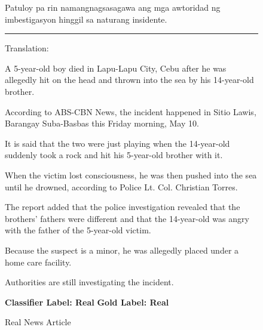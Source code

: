 \begin{figure}[h!]
{{                        \small \raggedright Patuloy pa rin namangnagsasagawa ang mga awtoridad ng imbestigasyon hinggil sa naturang insidente.\linebreak

                        \noindent\rule{0.5\textwidth}{0.4pt}\linebreak\linebreak

                          Translation:\newline \newline
                          
                          \small \raggedright A 5-year-old boy died in Lapu-Lapu City, Cebu after he was allegedly hit on the head and thrown into the sea by his 14-year-old brother.\linebreak

                          \small \raggedright According to ABS-CBN News, the incident happened in Sitio Lawis, Barangay Suba-Basbas this Friday morning, May 10.\linebreak

                          \small \raggedright It is said that the two were just playing when the 14-year-old suddenly took a rock and hit his 5-year-old brother with it.\linebreak

                          \small \raggedright When the victim lost consciousness, he was then pushed into the sea until he drowned, according to Police Lt. Col. Christian Torres.\linebreak

                          \small \raggedright The report added that the police investigation revealed that the brothers' fathers were different and that the 14-year-old was angry with the father of the 5-year-old victim.\linebreak

                          \small \raggedright Because the suspect is a minor, he was allegedly placed under a home care facility.\linebreak

                          \small \raggedright Authorities are still investigating the incident.\linebreak
                            \linebreak\linebreak

                            \textbf{Classifier Label: Real} \newline
                            \textbf{Gold Label: Real}

                        }
                      }
                         \caption{Real News Article}
                            \label{fig:real-article}
                        \end{figure}
\clearpage
\pagebreak
